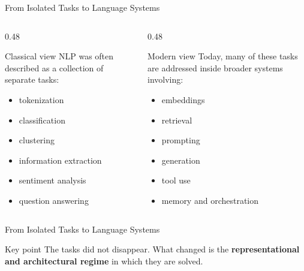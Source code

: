 \documentclass[aspectratio=169]{beamer}
\begin{document}
%
%
\begin{frame}{From Isolated Tasks to Language Systems}
\begin{columns}[T]
\begin{column}{0.48\textwidth}
\begin{block}{Classical view}
NLP was often described as a collection of separate tasks:
\begin{itemize}
    \item tokenization
    \item classification
    \item clustering
    \item information extraction
    \item sentiment analysis
    \item question answering
\end{itemize}
\end{block}
\end{column}
\begin{column}{0.48\textwidth}
\begin{block}{Modern view}
Today, many of these tasks are addressed inside broader systems involving:
\begin{itemize}
    \item embeddings
    \item retrieval
    \item prompting
    \item generation
    \item tool use
    \item memory and orchestration
\end{itemize}
\end{block}
\end{column}
\end{columns}
\end{frame}
%
%
\begin{frame}{From Isolated Tasks to Language Systems}
\vspace{0.12cm}
\begin{alertblock}{Key point}
The tasks did not disappear. What changed is the \textbf{representational and architectural regime} in which they are solved.
\end{alertblock}
\end{frame}
%
%
\end{document}
